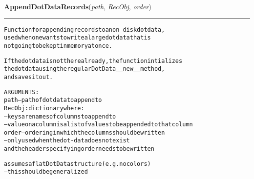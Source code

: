     \vspace{0.5ex}

\hspace{.8\funcindent}\begin{boxedminipage}{\funcwidth}

    \raggedright \textbf{AppendDotDataRecords}(\textit{path}, \textit{RecObj}, \textit{order})

    \vspace{-1.5ex}

    \rule{\textwidth}{0.5\fboxrule}
\setlength{\parskip}{2ex}
\begin{alltt}

Function for appending records to an on-disk dotdata, 
used when one wants to write a large dotdata that is
not going to be kept in memory at once. 

If the dotdata is not there already, the function intializes
the dotdata using the regular DotData \_\_new\_\_ method,
and saves it out. 

ARGUMENTS:
        path -- path of dotdata to append to
        RecObj : dictionary where:
                        -- keys are names of columns to append to
                        -- value on a column is a list of values to be appended to that column
        order -- ordering in which the columns should be written
                        -- only used when the dot-data does not exist
        and the header specifying order needs to be written 

assumes a flat DotData structure (e.g. no colors) 
        -- this should be generalized
\end{alltt}

\setlength{\parskip}{1ex}
    \end{boxedminipage}

